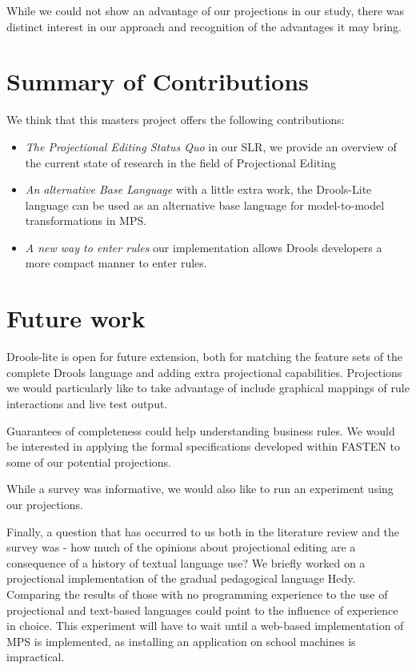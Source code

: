 While we could not show an advantage of our projections in our study, there was distinct interest in our approach and recognition of the advantages it may bring.

\section{Summary of Contributions}

We think that this masters project offers the following contributions:
\begin{itemize}
    \item \emph{The Projectional Editing Status Quo} in our SLR, we provide an overview of the current state of research in the field of Projectional Editing
    \item \emph{An alternative Base Language} with a little extra work, the Drools-Lite language can be used as an alternative base language for model-to-model transformations in MPS.
    \item \emph{A new way to enter rules} our implementation allows Drools developers a more compact manner to enter rules.
\end{itemize}

\section{Future work}

Drools-lite is open for future extension, both for matching the feature sets of the complete Drools language and adding extra projectional capabilities.
Projections we would particularly like to take advantage of include graphical mappings of rule interactions and live test output.

Guarantees of completeness could help understanding business rules.
We would be interested in applying the formal specifications developed within FASTEN\cite{ratiu2019fasten} to some of our potential projections.

While a survey was informative, we would also like to run an experiment using our projections.

Finally, a question that has occurred to us both in the literature review and the survey was - how much of the opinions about projectional editing are a consequence of a history of textual language use?
We briefly worked on a projectional implementation of the gradual pedagogical language Hedy\cite{hermans2020hedy}.
Comparing the results of those with no programming experience to the use of projectional and text-based languages could point to the influence of experience in choice.
This experiment will have to wait until a web-based implementation of MPS is implemented, as installing an application on school machines is impractical.
